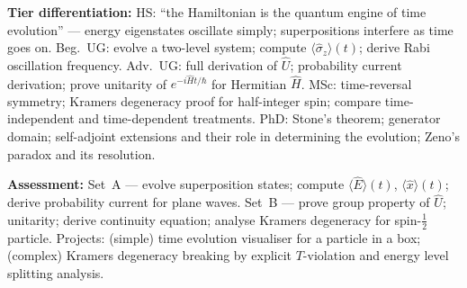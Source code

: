\documentclass[11pt,a4paper]{article}
\begin{document}
\begin{tcolorbox}[modulebox, title={Module~I.3 / L05: Time Evolution I --- Time-Independent Hamiltonians}]
\medskip\textbf{Tier differentiation:}
HS: ``the Hamiltonian is the quantum engine of time evolution'' --- energy eigenstates
oscillate simply; superpositions interfere as time goes on.
Beg.\ UG: evolve a two-level system; compute $\langle\hat{\sigma}_z\rangle(t)$;
derive Rabi oscillation frequency.
Adv.\ UG: full derivation of $\hat{U}$; probability current derivation;
prove unitarity of $e^{-i\hat{H}t/\hbar}$ for Hermitian $\hat{H}$.
MSc: time-reversal symmetry; Kramers degeneracy proof for half-integer spin;
compare time-independent and time-dependent treatments.
PhD: Stone's theorem; generator domain; self-adjoint extensions and their role in
determining the evolution; Zeno's paradox and its resolution.

\medskip\textbf{Assessment:}
Set~A --- evolve superposition states; compute $\langle\hat{E}\rangle(t)$,
$\langle\hat{x}\rangle(t)$; derive probability current for plane waves.
Set~B --- prove group property of $\hat{U}$; unitarity; derive continuity equation;
analyse Kramers degeneracy for spin-$\tfrac{1}{2}$ particle.
Projects: (simple) time evolution visualiser for a particle in a box;
(complex) Kramers degeneracy breaking by explicit $T$-violation and energy level
splitting analysis.
\end{tcolorbox}
\end{document}
